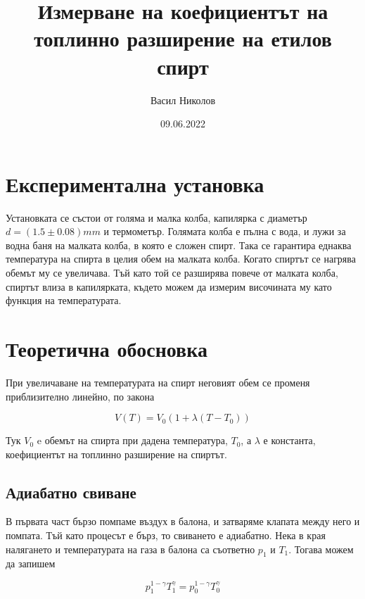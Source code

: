 \documentclass[%
 reprint,
 amsmath,amssymb,
 aps,
]{revtex4-2}
\begin{document}
\setlength{\abovedisplayskip}{3pt}
\setlength{\belowdisplayskip}{3pt}    

\title{Измерване на коефициентът на топлинно разширение на етилов спирт}
\author{Васил Николов}
\date{09.06.2022}
\maketitle
\section{Експериментална установка}

Установката се състои от голяма и малка колба, капилярка с диаметър $d = (1.5 \pm 0.08) \si{mm}$ и термометър. Голямата колба е пълна с вода, и лужи за водна баня на малката колба, в която е сложен спирт. Така се гарантира еднаква температура на спирта в целия обем на малката колба. Когато спиртът се нагрява обемът му се увеличава. Тъй като той се разширява повече от малката колба, спиртът влиза в капилярката, където можем да измерим височината му като функция на температурата.

\section{Теоретична обосновка}

При увеличаване на температурата на спирт неговият обем се променя приблизително линейно, по закона 

\begin{equation*}
    V(T) = V_0 (1 + \lambda (T - T_0))
\end{equation*}

Тук $V_0$ e обемът на спирта при дадена температура, $T_0$, а $\lambda$ е константа, коефициентът на топлинно разширение на спиртът.

\subsection{Адиабатно свиване}

В първата част бързо помпаме въздух в балона, и затваряме клапата между него и помпата. Тъй като процесът е бърз, то свиването е адиабатно. Нека в края налягането и температурата на газа в балона са съответно $p_1$ и $T_1$. Тогава можем да запишем

\begin{equation*}
    p_1^{1-\gamma} T_1^{\gamma} = p_0^{1 - \gamma} T_0^{\gamma}
\end{equation*}
\end{document}
